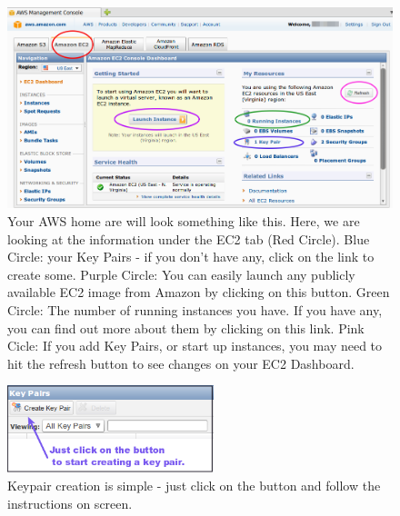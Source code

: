 \begin{figure}[!hd]
	\fbox
	{
		\begin{minipage}{13cm}
\includegraphics[width=\maxwidth]{"images/EC2Homepage2"}
\caption[EC2 Homepage]{\label{fig:ec2homepage}Your AWS home are will look something like this. Here, we are looking at the information under the EC2 tab (Red Circle). Blue Circle: your Key Pairs - if you don't have any, click on the link to create some. Purple Circle: You can easily launch any publicly available EC2 image from Amazon by clicking on this button. Green Circle: The number of running instances you have. If you have any, you can find out more about them by clicking on this link. Pink Cicle: If you add Key Pairs, or start up instances, you may need to hit the refresh button to see changes on your EC2 Dashboard.}
		\end{minipage}
	}
\end{figure}


\begin{figure}
\includegraphics[width=60mm]{"images/keypairCreateButton"}
\caption[Keypair creation]{\label{fig:keypaircreate}Keypair creation is simple - just click on the button and follow the instructions on screen.}
\end{figure}

